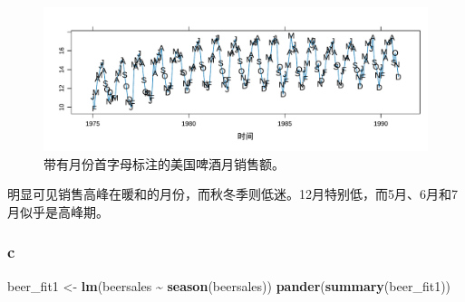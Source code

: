 \documentclass[
]{article}
\newenvironment{Shaded}{\begin{snugshade}}{\end{snugshade}}
\newcommand{\FunctionTok}[1]{\textcolor[rgb]{0.13,0.29,0.53}{\textbf{#1}}}
\newcommand{\NormalTok}[1]{#1}
\newcommand{\OtherTok}[1]{\textcolor[rgb]{0.56,0.35,0.01}{#1}}
\newcommand{\SpecialCharTok}[1]{\textcolor[rgb]{0.81,0.36,0.00}{\textbf{#1}}}
\begin{document}
\begin{figure}
\centering
\includegraphics{chapter3_files/figure-latex/unnamed-chunk-7-1.pdf}
\caption{\label{fig:unnamed-chunk-7}带有月份首字母标注的美国啤酒月销售额。}
\end{figure}

明显可见销售高峰在暖和的月份，而秋冬季则低迷。12月特别低，而5月、6月和7月似乎是高峰期。

\hypertarget{c-1}{%
\subsubsection*{c}\label{c-1}}

\begin{Shaded}
\begin{Highlighting}[]
\NormalTok{beer\_fit1 }\OtherTok{\textless{}{-}} \FunctionTok{lm}\NormalTok{(beersales }\SpecialCharTok{\textasciitilde{}} \FunctionTok{season}\NormalTok{(beersales))}
\FunctionTok{pander}\NormalTok{(}\FunctionTok{summary}\NormalTok{(beer\_fit1))}
\end{Highlighting}
\end{Shaded}
\end{document}
